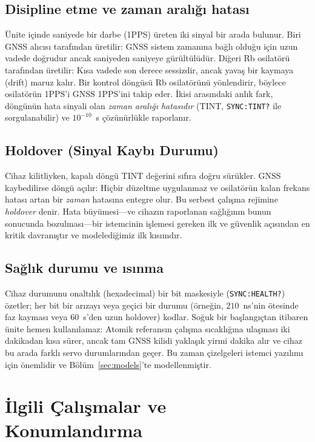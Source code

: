 \documentclass[conference]{IEEEtran}
\begin{document}
\subsection{Disipline etme ve zaman aralığı hatası}
Ünite içinde saniyede bir darbe (1PPS) üreten iki sinyal bir arada bulunur. Biri GNSS alıcısı tarafından üretilir: GNSS sistem zamanına bağlı olduğu için uzun vadede doğrudur ancak saniyeden saniyeye gürültülüdür. Diğeri Rb osilatörü tarafından üretilir: Kısa vadede son derece sessizdir, ancak yavaş bir kaymaya (drift) maruz kalır. Bir kontrol döngüsü Rb osilatörünü yönlendirir, böylece osilatörün 1PPS'i GNSS 1PPS'ini takip eder. İkisi arasındaki anlık fark, döngünün hata sinyali olan \emph{zaman aralığı hatasıdır} (TINT, \texttt{SYNC:TINT?} ile sorgulanabilir) ve $10^{-10}$~s çözünürlükle raporlanır.

\subsection{Holdover (Sinyal Kaybı Durumu)}
Cihaz kilitliyken, kapalı döngü TINT değerini sıfıra doğru sürükler. GNSS kaybedilirse döngü açılır: Hiçbir düzeltme uygulanmaz ve osilatörün kalan frekans hatası artan bir \emph{zaman} hatasına entegre olur. Bu serbest çalışma rejimine \emph{holdover} denir. Hata büyümesi---ve cihazın raporlanan sağlığının bunun sonucunda bozulması---bir istemcinin işlemesi gereken ilk ve güvenlik açısından en kritik davranıştır ve modelediğimiz ilk kısımdır.

\subsection{Sağlık durumu ve ısınma}
Cihaz durumunu onaltılık (hexadecimal) bir bit maskesiyle (\texttt{SYNC:HEALTH?}) özetler; her bit bir arızayı veya geçici bir durumu (örneğin, $210$~ns'nin ötesinde faz kayması veya $60$~s'den uzun holdover) kodlar. Soğuk bir başlangıçtan itibaren ünite hemen kullanılamaz: Atomik referansın çalışma sıcaklığına ulaşması iki dakikadan kısa sürer, ancak tam GNSS kilidi yaklaşık yirmi dakika alır ve cihaz bu arada farklı servo durumlarından geçer. Bu zaman çizelgeleri istemci yazılımı için önemlidir ve Bölüm~\ref{sec:models}'te modellenmiştir.

\section{İlgili Çalışmalar ve Konumlandırma}
\label{sec:related}
\end{document}
